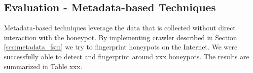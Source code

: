 \subsection{Evaluation - Metadata-based Techniques}
Metadata-based techniques leverage the data that is collected without direct interaction with the honeypot. By implementing crawler described in Section \ref{sec:metadata_fsm} we try to fingerprint honeypots on the Internet. We were successfully able to detect and fingerprint around xxx honeypots. The results are summarized in Table xxx.  


